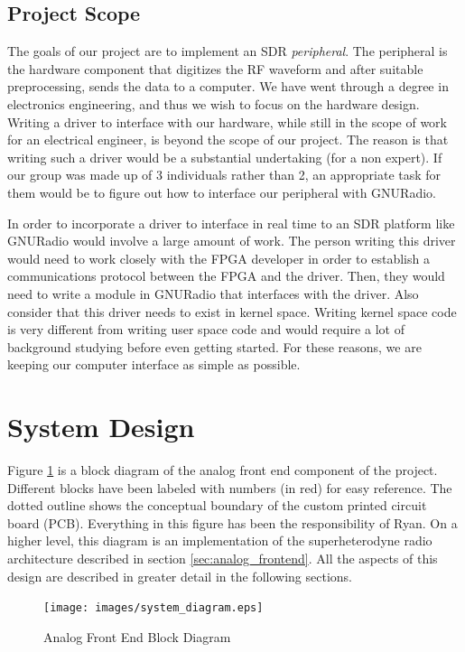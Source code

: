 \documentclass[a4paper, 12pt, notitlepage]{article}
\begin{document}
\subsection{Project Scope}
The goals of our project are to implement an SDR \textit{peripheral}.  The peripheral is the hardware component that digitizes the RF waveform and after suitable preprocessing, sends the data to a computer.  We have went through a degree in electronics engineering, and thus we wish to focus on the hardware design.  Writing a driver to interface with our hardware, while still in the scope of work for an electrical engineer, is beyond the scope of our project.  The reason is that writing such a driver would be a substantial undertaking (for a non expert).  If our group was made up of 3 individuals rather than 2, an appropriate task for them would be to figure out how to interface our peripheral with GNURadio.

In order to incorporate a driver to interface in real time to an SDR platform like GNURadio would involve a large amount of work.  The person writing this driver would need to work closely with the FPGA developer in order to establish a communications protocol between the FPGA and the driver.  Then, they would need to write a module in GNURadio that interfaces with the driver.  Also consider that this driver needs to exist in kernel space.  Writing kernel space code is very different from writing user space code and would require a lot of background studying before even getting started.  For these reasons, we are keeping our computer interface as simple as possible.

%
%

\section{System Design}
Figure \ref{fig:analog_block_diagram} is a block diagram of the analog front end component of the project.  Different blocks have been labeled with numbers (in red) for easy reference.  The dotted outline shows the conceptual boundary of the custom printed circuit board (PCB).  Everything in this figure has been the responsibility of Ryan.  On a higher level, this diagram is an implementation of the superheterodyne radio architecture described in section \ref{sec:analog_frontend}.  All the aspects of this design are described in greater detail in the following sections.

\begin{figure}
  \centering
  \caption{Analog Front End Block Diagram}
  \label{fig:analog_block_diagram}
  \texttt{[image: images/system\_diagram.eps]}
\end{figure}
\end{document}
